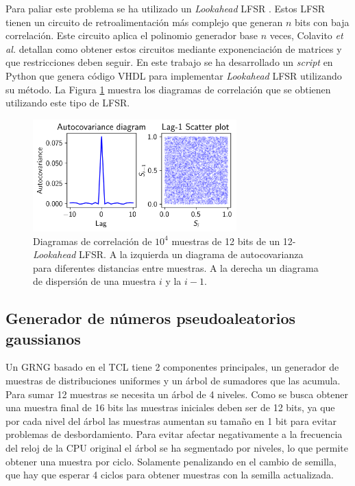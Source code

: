 Para paliar este problema se ha utilizado un \textit{Lookahead} LFSR \cite{look_ahead_lfsr_base}. Estos LFSR tienen un circuito de retroalimentación más complejo que generan $n$ bits con baja correlación. Este circuito aplica el polinomio generador base $n$ veces, Colavito \emph{et al.} \cite{look_ahead_lfsr_design} detallan como obtener estos circuitos mediante exponenciación de matrices y que restricciones deben seguir. En este trabajo se ha desarrollado un \textit{script} en Python que genera código VHDL para implementar \textit{Lookahead} LFSR utilizando su método. La Figura \ref{fig:lfsr_good_corr} muestra los diagramas de correlación que se obtienen utilizando este tipo de LFSR.

\begin{figure}[h]
    \centering
    \includegraphics[width=0.7\textwidth]{root/Imagenes/5_riscv/lfsr_good_corr.png}
    \caption{Diagramas de correlación de $10^4$ muestras de 12 bits de un 12-\textit{Lookahead} LFSR. A la izquierda un diagrama de autocovarianza para diferentes distancias entre muestras. A la derecha un diagrama de dispersión de una muestra $i$ y la $i-1$.}
    \label{fig:lfsr_good_corr}
\end{figure}

\subsection{Generador de números pseudoaleatorios gaussianos}

Un GRNG basado en el TCL tiene 2 componentes principales, un generador de muestras de distribuciones uniformes y un árbol de sumadores que las acumula. Para sumar 12 muestras se necesita un árbol de 4 niveles. Como se busca obtener una muestra final de 16 bits las muestras iniciales deben ser de 12 bits, ya que por cada nivel del árbol las muestras aumentan su tamaño en 1 bit para evitar problemas de desbordamiento. Para evitar afectar negativamente a la frecuencia del reloj de la CPU original el árbol se ha segmentado por niveles, lo que permite obtener una muestra por ciclo. Solamente penalizando en el cambio de semilla, que hay que esperar 4 ciclos para obtener muestras con la semilla actualizada.

